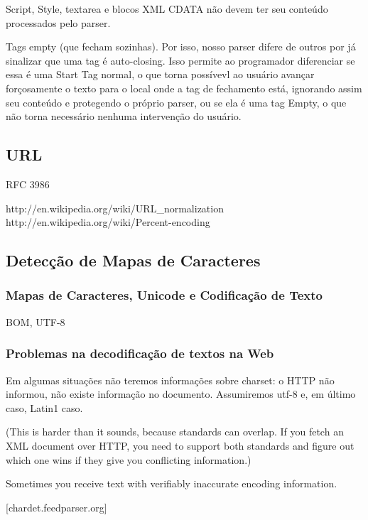 \documentclass[10pt,twocolumn]{article}
\begin{document}
Script, Style, textarea e blocos XML CDATA não devem ter seu conteúdo
processados pelo parser.

Tags empty (que fecham sozinhas). Por isso, nosso parser difere de outros por
já sinalizar que uma tag é auto-closing. Isso permite ao programador
diferenciar se essa é uma Start Tag normal, o que torna possívevl ao usuário
avançar forçosamente o texto para o local onde a tag de fechamento está,
ignorando assim seu conteúdo e protegendo o próprio parser, ou se ela é uma tag
Empty, o que não torna necessário nenhuma intervenção do usuário.

\subsection{URL}

RFC 3986

http://en.wikipedia.org/wiki/URL\_normalization
http://en.wikipedia.org/wiki/Percent-encoding




\subsection{Detecção de Mapas de Caracteres}

\subsubsection{Mapas de Caracteres, Unicode e Codificação de Texto}
BOM, UTF-8

\subsubsection{Problemas na decodificação de textos na Web}

Em algumas situações não teremos informações sobre charset: o HTTP não
informou, não existe informação no documento. Assumiremos utf-8 e, em
último caso, Latin1 caso.

    (This is harder than it sounds, because standards can overlap. If
    you fetch an XML document over HTTP, you need to support both
    standards and figure out which one wins if they give you conflicting
    information.)
    
    Sometimes you receive text with verifiably inaccurate encoding information.
    
    [chardet.feedparser.org]
\end{document}
